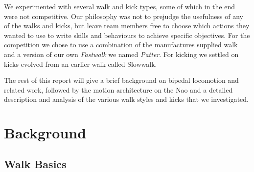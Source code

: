 \documentclass[pdftex,11pt,a4paper]{report}
\begin{document}
We experimented with several walk and kick types, some of which in the end were not competitive. Our philosophy was not to prejudge the usefulness  of any of the walks and kicks, but leave team members free to choose which actions they wanted to use to write skills and behaviours to achieve specific objectives. For the competition we chose to use a combination of the manufactures supplied walk and a version of our own \emph{Fastwalk} we named \emph{Patter}. For kicking we settled on kicks evolved from an earlier walk called Slowwalk.  

The rest of this report will give a brief background on bipedal locomotion and related work, followed by the motion architecture on the Nao and a detailed description and analysis of the various walk styles and kicks that we investigated. 

\section{Background} 
\subsection{Walk Basics}\label{sectionWalkBasics}
\end{document}
